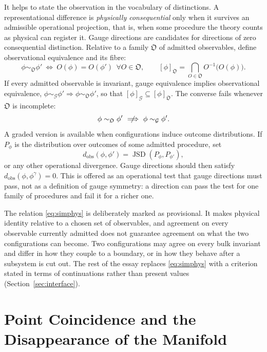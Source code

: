 \documentclass[11pt]{article}
\theoremstyle{plain}
\theoremstyle{definition}
\theoremstyle{remark}
\newcommand{\JSD}{\operatorname{JSD}}
\newcommand{\G}{\mathcal G}
\begin{document}
It helps to state the observation in the vocabulary of distinctions. A representational difference is \emph{physically consequential} only when it survives an admissible operational projection, that is, when some procedure the theory counts as physical can register it. Gauge directions are candidates for directions of zero consequential distinction. Relative to a family $\mathfrak O$ of admitted observables, define observational equivalence and its fibre:
\begin{equation}\label{eq:simphys}
\phi\sim_{\mathfrak O}\phi'
\ \Longleftrightarrow\
O(\phi)=O(\phi')\ \ \forall O\in\mathfrak O,
\qquad
[\phi]_{\mathfrak O}=\bigcap_{O\in\mathfrak O}O^{-1}\big(O(\phi)\big).
\end{equation}
If every admitted observable is invariant, gauge equivalence implies observational equivalence, $\phi\sim_\G\phi'\Rightarrow\phi\sim_{\mathfrak O}\phi'$, so that $[\phi]_\G\subseteq[\phi]_{\mathfrak O}$. The converse fails whenever $\mathfrak O$ is incomplete:
\begin{equation}
\phi\sim_{\mathfrak O}\phi'\ \centernot\Longrightarrow\ \phi\sim_\G\phi' .
\end{equation}
A graded version is available when configurations induce outcome distributions. If $P_\phi$ is the distribution over outcomes of some admitted procedure, set
\begin{equation}
d_{\mathrm{obs}}(\phi,\phi')=\JSD(P_\phi,P_{\phi'}),
\end{equation}
or any other operational divergence. Gauge directions should then satisfy $d_{\mathrm{obs}}(\phi,\phi^\gamma)=0$. This is offered as an operational test that gauge directions must pass, not as a definition of gauge symmetry: a direction can pass the test for one family of procedures and fail it for a richer one.

The relation \eqref{eq:simphys} is deliberately marked as provisional. It makes physical identity relative to a chosen set of observables, and agreement on every observable currently admitted does not guarantee agreement on what the two configurations can become. Two configurations may agree on every bulk invariant and differ in how they couple to a boundary, or in how they behave after a subsystem is cut out. The rest of the essay replaces \eqref{eq:simphys} with a criterion stated in terms of continuations rather than present values (Section~\ref{sec:interface}).

\section{Point Coincidence and the Disappearance of the Manifold}\label{sec:pc}
\end{document}

